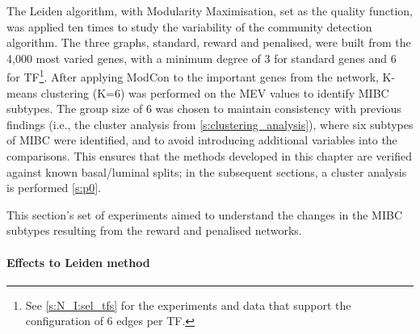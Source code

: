 The Leiden algorithm, with Modularity Maximisation, set as the quality function, was applied ten times to study the variability of the community detection algorithm. The three graphs, standard, reward and penalised, were built from the 4,000 most varied genes, with a minimum degree of 3 for standard genes and 6 for TF\footnote{See \cref{s:N_I:sel_tfs} for the experiments and data that support the configuration of 6 edges per TF.}. After applying ModCon to the important genes from the network, K-means clustering (K=6) was performed on the MEV values to identify MIBC subtypes. The group size of 6 was chosen to maintain consistency with previous findings (i.e., the cluster analysis from \cref{s:clustering_analysis}), where six subtypes of MIBC were identified, and to avoid introducing additional variables into the comparisons. This ensures that the methods developed in this chapter are verified against known basal/luminal splits; in the subsequent sections, a cluster analysis is performed \cref{s:p0}. 

This section's set of experiments aimed to understand the changes in the MIBC subtypes resulting from the reward and penalised networks.

\paragraph*{Effects to Leiden method}


